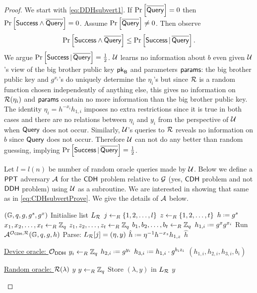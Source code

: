 \begin{proof}
We start with \ref{eq:DDHsubvert1}. If $\operatorname{Pr}\left[{\overline{\mathstrut\mathsf{Query}}}\right] = 0$ then $\operatorname{Pr}\left[{\mathsf{Success}\wedge\overline{\mathstrut\mathsf{Query}}}\right] = 0$. Assume $\operatorname{Pr}\left[{\overline{\mathstrut\mathsf{Query}}}\right] \neq 0$. Then observe
\begin{align*}
	\operatorname{Pr}\left[{\mathsf{Success}\wedge\overline{\mathstrut\mathsf{Query}}}\right] \leq \operatorname{Pr}\left[\mathsf{Success}\,\vert\,\overline{\mathstrut\mathsf{Query}}\right].
\end{align*}
We argue $\operatorname{Pr}\left[\mathsf{Success}\,\vert\,\overline{\mathstrut\mathsf{Query}}\right] = \frac{1}{2}$. $\mathcal{U}$ learns no information about $b$ even given $\mathcal{U}$'s view of the big brother public key $\mathsf{pk}_{\mathsf{B}}$ and parameters $\mathsf{params}$: the big brother public key and $g^{x_i}$'s do uniquely determine the $\eta_i$'s but since $\operatorname{\mathcal{R}}$ is a random function chosen independently of anything else, this gives no information on $\operatorname{\mathcal{R}}(\eta_i)$ and $\mathsf{params}$ contain no more information than the big brother public key. The identity $\eta_i = h^{-x_i}h_{1,i}$ imposes no extra restrictions since it is true in both cases and there are no relations between $\eta_i$ and $y_i$ from the perspective of $\mathcal{U}$ when $\mathsf{Query}$ does not occur. Similarly, $\mathcal{U}$'s queries to $\operatorname{\mathcal{R}}$ reveals no information on $b$ since $\mathsf{Query}$ does not occur. Therefore $\mathcal{U}$ can not do any better than random guessing, implying $\operatorname{Pr}\left[\mathsf{Success}\,\vert\,\overline{\mathstrut\mathsf{Query}}\right] = \frac{1}{2}$.

Let $l = l(n)$ be number of random oracle queries made by $\mathcal{U}$. Below we define a $\mathsf{PPT}$ adversary $\mathcal{A}$ for the $\mathsf{CDH}$ problem relative to $\operatorname{\mathcal{G}}$ (yes, $\mathsf{CDH}$ problem and not $\mathsf{DDH}$ problem) using $\mathcal{U}$ as a subroutine. We are interested in showing that same as in \ref{eq:CDHsubvertProve}. We give the details of $\mathcal{A}$ below.
 
\vspace*{-.3cm}
\begin{Algorithm}[]{6cm}
\captionAdversary
\caption{$\adve'$}
\label{alg:CDHadve1}
\begin{algorithmic}[1]
\Require $(\mathbb{G},q,g,g^s,g^x)$ 
\State Initialise list $L_{\operatorname{\mathcal{R}}}$
\State $j\leftarrow_R\{1,2,\ldots,l\}$
\State $z\leftarrow_R\{1,2,\ldots,t\}$
\State $h \defeq g^s$
\State $x_1,x_2,\ldots,x_t\leftarrow_R\mathbb{Z}_q$
\State $z_1,z_2,\ldots,z_t\leftarrow_R\mathbb{Z}_q$
\State $b_1,b_2,\ldots,b_t\leftarrow_R\mathbb{Z}_q$
\State $h_{1,i} \defeq g^xg^{x_i}$
\State Run $\mathcal{A}^{\operatorname{\mathcal{O}}_{\mathsf{CDH}},\operatorname{\mathcal{R}}}(\mathbb{G},q,g,h)$
\State Parse: $L_{\operatorname{\mathcal{R}}}[j] = (\eta,y)$
\State $\hat{h} \defeq \eta^{-1}h^{-x_z}h_{1,z}$
\State \Ret $\hat{h}$
\Statex\hrulefill
\end{algorithmic}
\begin{algorithmic}[1]
\Statex \underline{Device oracle: \textbf{$\operatorname{\mathcal{O}}_{\mathsf{DDH}}$}}
\Statex
\State $y_i\leftarrow_R\mathbb{Z}_q$
\State $h_{2,i} \defeq g^{y_i}$
\State $h_{3,i} \defeq h_{1,i}\cdot g^{b_iz_i}$
\State \Ret $(h_{1,i},h_{2,i},h_{3,i},b_i)$
\end{algorithmic}
\begin{algorithmic}[1]
\Statex \underline{Random oracle: \textbf{$\operatorname{\mathcal{R}}(\lambda)$}}
\Statex
{}
\State \Ret $y$
\Else
\State $y\leftarrow_R \mathbb{Z}_q$
\State Store $(\lambda,y)$ in $L_{\operatorname{\mathcal{R}}}$
\State \Ret $y$
\EndIf
\end{algorithmic}
\end{Algorithm}


\end{proof}

